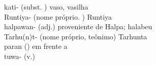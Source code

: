 
\normalsize
kati- (subst. \Neut) vaso, vasilha\\
Runtiya- (nome próprio. \Com) Runtiya\\
halpawan- (adj.) proveniente de Halpa; halabeu\\
Tarhu(n)t- (nome próprio, teônimo) Tarhunta\\
paran (\Prep) em frente a\\
tuwa- (v.)\\
